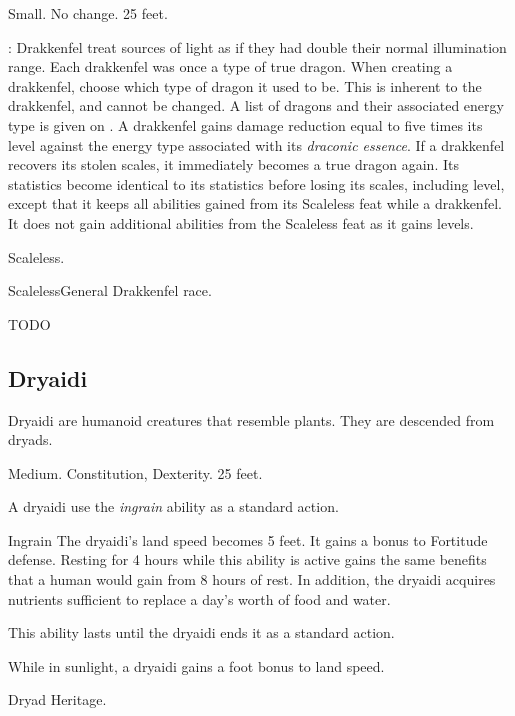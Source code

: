          Small.
         No change.
         25 feet.
        \begin{itemize}
            : Drakkenfel treat sources of light as if they had double their normal illumination range.
             Each drakkenfel was once a type of true dragon.
                When creating a drakkenfel, choose which type of dragon it used to be.
                This is inherent to the drakkenfel, and cannot be changed.
                A list of dragons and their associated energy type is given on .
             A drakkenfel gains damage reduction equal to five times its level against the energy type associated with its \textit{draconic essence}.
             If a drakkenfel recovers its stolen scales, it immediately becomes a true dragon again.
                Its statistics become identical to its statistics before losing its scales, including level, except that it keeps all abilities gained from its Scaleless feat while a drakkenfel.
                It does not gain additional abilities from the Scaleless feat as it gains levels.
        \end{itemize}
         Scaleless.

        \begin{feat}{Scaleless}{General}
            \featpre Drakkenfel race.

            TODO
            
        \end{feat}

    \subsection{Dryaidi}

        Dryaidi are humanoid creatures that resemble plants. They are descended from dryads.

         Medium.
          Constitution,  Dexterity.
         25 feet.
        \begin{itemize}
             A dryaidi use the \textit{ingrain} ability as a standard action.
                \begin{freeability}{Ingrain}
                    The dryaidi's land speed becomes 5 feet.
                    It gains a  bonus to Fortitude defense.
                    Resting for 4 hours while this ability is active gains the same benefits that a human would gain from 8 hours of rest.
                    In addition, the dryaidi acquires nutrients sufficient to replace a day's worth of food and water.

                    This ability lasts until the dryaidi ends it as a standard action.
                \end{freeability}
             While in sunlight, a dryaidi gains a  foot bonus to land speed.
        \end{itemize}
         Dryad Heritage.

